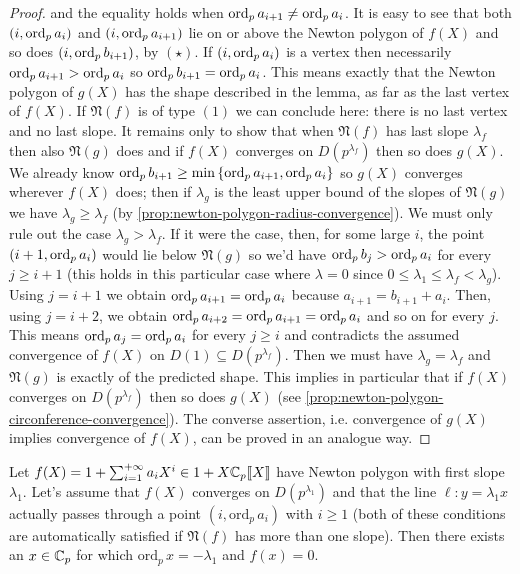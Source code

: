 \begin{proof}
			and the equality holds when $\textrm{ord}_p\, a_{i+1} \neq \textrm{ord}_p\, a_i$. It is easy to see that both $(i, \textrm{ord}_p\, a_i)$ and $(i, \textrm{ord}_p\, a_{i+1})$ lie on or above the Newton polygon of $f(X)$ and so does $(i, \textrm{ord}_p\, b_{i+1})$, by $(\star)$. If $(i, \textrm{ord}_p\, a_i)$ is a vertex then necessarily $\textrm{ord}_p\, a_{i+1} > \textrm{ord}_p\, a_i$ so $\textrm{ord}_p\, b_{i+1} = \textrm{ord}_p\, a_i$. This means exactly that the Newton polygon of $g(X)$ has the shape described in the lemma, as far as the last vertex of $f(X)$. If $\mathfrak{N}(f)$ is of type $(1)$ we can conclude here: there is no last vertex and no last slope. It remains only to show that when $\mathfrak{N}(f)$ has last slope $\lambda_f$ then also $\mathfrak{N}(g)$ does and if $f(X)$ converges on $D(p^{\lambda_f})$ then so does $g(X)$. We already know $\textrm{ord}_p\, b_{i+1} \geq \min\left\{\textrm{ord}_p\, a_{i+1}, \textrm{ord}_p\, a_i \right\}$ so $g(X)$ converges wherever $f(X)$ does; then if $\lambda_g$ is the least upper bound of the slopes of $\mathfrak{N}(g)$ we have $\lambda_g \geq \lambda_f$ (by \cref{prop:newton-polygon-radius-convergence}). We must only rule out the case $\lambda_g > \lambda_f$. If it were the case, then, for some large $i$, the point $(i+1, \textrm{ord}_p\, a_i)$ would lie below $\mathfrak{N}(g)$ so we'd have $\textrm{ord}_p\, b_j > \textrm{ord}_p\, a_i$ for every $j  \geq i+1$ (this holds in this particular case where $\lambda = 0$ since $0 \leq \lambda_1 \leq \lambda_f < \lambda_g$). Using $j = i+1$ we obtain $\textrm{ord}_p\, a_{i+1} = \textrm{ord}_p\, a_i$ because $a_{i+1} = b_{i+1} + a_i$. Then, using $j = i+2$, we obtain $\textrm{ord}_p\, a_{i+2} = \textrm{ord}_p\, a_{i+1} = \textrm{ord}_p\, a_i$ and so on for every $j$. This means $\textrm{ord}_p\, a_j = \textrm{ord}_p\, a_i$ for every $j \geq i$ and contradicts the assumed convergence of $f(X)$ on $D(1) \subseteq D(p^{\lambda_f})$. Then we must have $\lambda_g = \lambda_f$ and $\mathfrak{N}(g)$ is exactly of the predicted shape. This implies in particular that if $f(X)$ converges on $D(p^{\lambda_f})$ then so does $g(X)$ (see \cref{prop:newton-polygon-circonference-convergence}). The converse assertion, i.e. convergence of $g(X)$ implies convergence of $f(X)$, can be proved in an analogue way.
		\end{proof}
		\begin{lemma}
			\label{lemma:lemma7-p.103}
			Let $f(X) = 1 + \sum_{i=1}^{+\infty} a_iX^i \in 1 + X\mathbb{C}_p\llbracket {X} \rrbracket$ have Newton polygon with first slope $\lambda_1$. Let's assume that $f(X)$ converges on $D\left(p^{\lambda_1}\right)$ and that the line $\ell\colon y = \lambda_1x$ actually passes through a point $(i, \mathrm{ord}_p\, a_i)$ with $i \geq 1$ (both of these conditions are automatically satisfied if $\mathfrak{N}(f)$ has more than one slope). Then there exists an $x \in \mathbb{C}_p$ for which $\mathrm{ord}_p\, x = -\lambda_1$ and $f(x) = 0$.
		\end{lemma}
